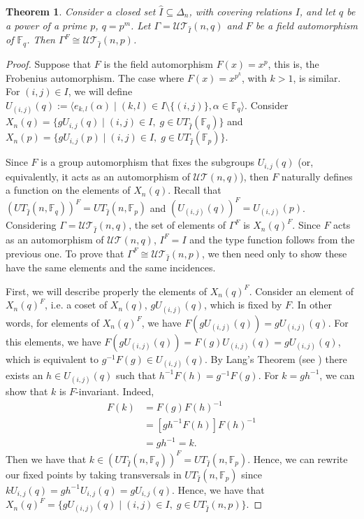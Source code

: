 \documentclass[11pt,letterpaper]{amsart}
\newtheorem{theorem}{Theorem}[section]
\newcommand{\TT}{\mathcal{T}}
\newcommand{\FF}{\mathbb{F}}
\newcommand{\UU}{\mathcal{U}}
\begin{document}
\begin{theorem}
    Consider a closed set $\widehat{I}\subseteq \Delta_n$, with covering relations $I$, and let $q$ be a power of a prime $p$, $q=p^m$.
    Let $\Gamma = \UU\TT_{\widehat{I}}(n,q)$ and $F$ be a field automorphism of $\FF_q$. Then $\Gamma^F \cong \UU\TT_{\widehat{I}}(n,p)$.
\end{theorem}
\begin{proof}
    Suppose that $F$ is the field automorphism $F(x)=x^p$, this is, the Frobenius automorphism. The case where $F(x)=x^{p^k}$, with $k>1$, is similar.
    For $(i,j)\in I$, we will define $U_{(i,j)}(q) := \langle e_{k,l}(\alpha) \mid (k,l)\in I\setminus\{(i,j)\}, \alpha\in \FF_q\rangle$.
    Consider $X_n(q)=\{gU_{i,j}(q)\mid (i,j)\in I,\;g\in UT_{\widehat{I}}(\FF_q)\}$ and $X_n(p)=\{gU_{i,j}(p)\mid (i,j)\in I,\;g\in UT_{\widehat{I}}(\FF_p)\}$. 
    
    Since $F$ is a group automorphism that fixes the subgroups $U_{i,j}(q)$ (or, equivalently, it acts as an automorphism of $\UU\TT(n,q)$), then $F$ naturally defines a function on the elements of $X_n(q)$.
    Recall that $(UT_{\widehat{I}}(n,\FF_q))^F=UT_{\widehat{I}}(n,\FF_p)$ and $(U_{(i,j)}(q))^F=U_{(i,j)}(p)$. Considering $\Gamma = \UU\TT_{\widehat{I}}(n,q)$, the set of elements of $\Gamma^{F}$ is $X_n(q)^F$. Since $F$ acts as an automorphism of $\UU\TT(n,q)$, $I^F=I$ and the type function follows from the previous one. To prove that $\Gamma^F \cong \UU\TT_{\widehat{I}}(n,p)$, we then need only to show these have the same elements and the same incidences.

    First, we will describe properly the elements of $X_n(q)^F$. Consider an element of $X_n(q)^F$, i.e. a coset of $X_n(q)$, $gU_{(i,j)}(q)$, which is fixed by $F$. In other words, for elements of $X_n(q)^F$, we have $F(gU_{(i,j)}(q))=gU_{(i,j)}(q)$. For this elements, we have $F(gU_{(i,j)}(q)) = F(g)U_{(i,j)}(q)=gU_{(i,j)}(q)$, which is equivalent to $g^{-1}F(g)\in U_{(i,j)}(q)$.  By Lang's Theorem (see \cite{Lang1956}) there exists an $h\in  U_{(i,j)}(q)$ such that $h^{-1}F(h)=g^{-1}F(g)$. For $k=gh^{-1}$, we can show that $k$ is $F$-invariant. Indeed,
    \begin{align*}
        F(k)&=F(g)F(h)^{-1}\\
            &=[gh^{-1}F(h)]F(h)^{-1}\\
            &=gh^{-1}=k.
    \end{align*}
    Then we have that $k\in (UT_{\widehat{I}}(n,\FF_q))^F=UT_{\widehat{I}}(n,\FF_p)$. Hence, we can rewrite our fixed points by taking transversals in $UT_{\widehat{I}}(n,\FF_p)$ since $kU_{i,j}(q)=gh^{-1}U_{i,j}(q)=gU_{i,j}(q)$. Hence, we have that $X_n(q)^F=\{gU_{(i,j)}(q)\mid (i,j)\in I,\;g\in UT_{\widehat{I}}(n,p)\}$.


\end{proof}
\end{document}
